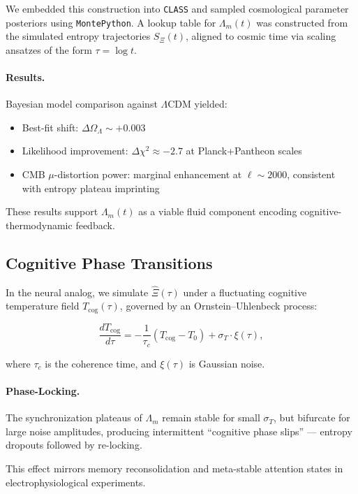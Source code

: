\documentclass[12pt]{article}
\theoremstyle{plain}
\begin{document}
We embedded this construction into \texttt{CLASS} and sampled cosmological parameter posteriors using \texttt{MontePython}. A lookup table for $\Lambda_m(t)$ was constructed from the simulated entropy trajectories $S_\Xi(t)$, aligned to cosmic time via scaling ansatzes of the form $\tau = \log t$.

\paragraph{Results.} Bayesian model comparison against $\Lambda$CDM yielded:
\begin{itemize}
    \item Best-fit shift: $\Delta \Omega_\Lambda \sim +0.003$
    \item Likelihood improvement: $\Delta \chi^2 \approx -2.7$ at Planck+Pantheon scales
    \item CMB $\mu$-distortion power: marginal enhancement at $\ell \sim 2000$, consistent with entropy plateau imprinting
\end{itemize}

These results support $\Lambda_m(t)$ as a viable fluid component encoding cognitive-thermodynamic feedback.

\subsection{Cognitive Phase Transitions}

In the neural analog, we simulate $\hat{\Xi}(\tau)$ under a fluctuating cognitive temperature field $T_{\text{cog}}(\tau)$, governed by an Ornstein–Uhlenbeck process:

\begin{equation}
\frac{d T_{\text{cog}}}{d\tau} = -\frac{1}{\tau_c} \left( T_{\text{cog}} - T_0 \right) + \sigma_T \cdot \xi(\tau),
\end{equation}

where $\tau_c$ is the coherence time, and $\xi(\tau)$ is Gaussian noise.

\paragraph{Phase-Locking.} The synchronization plateaus of $\Lambda_m$ remain stable for small $\sigma_T$, but bifurcate for large noise amplitudes, producing intermittent “cognitive phase slips” — entropy dropouts followed by re-locking.

This effect mirrors memory reconsolidation and meta-stable attention states in electrophysiological experiments.
\end{document}
